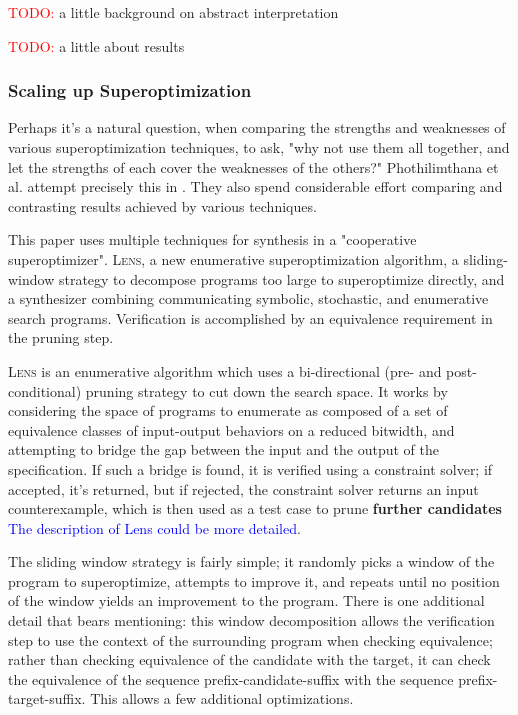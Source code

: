 \documentclass[12pt,twoside]{reedthesis}
\newcommand{\red}[1]{\textcolor{red}{#1}}
\newcommand{\comment}[2]{\textbf{#1} \textcolor{blue}{#2}}
\begin{document}
\red{TODO:} a little background on abstract interpretation
    
\red{TODO:} a little about results

\subsubsection{Scaling up Superoptimization}

Perhaps it's a natural question, when comparing the strengths and weaknesses of various superoptimization techniques, to ask, "why not use them all together, and let the strengths of each cover the weaknesses of the others?"
Phothilimthana et al. attempt precisely this in \cite{phothilimthana2016scaling}.
They also spend considerable effort comparing and contrasting results achieved by various techniques.
    
This paper uses multiple techniques for synthesis in a "cooperative superoptimizer".
\textsc{Lens}, a new enumerative superoptimization algorithm,
a sliding-window strategy to decompose programs too large to superoptimize directly,
and a synthesizer combining communicating symbolic, stochastic, and enumerative search programs.
Verification is accomplished by an equivalence requirement in the pruning step.
    
\textsc{Lens} is an enumerative algorithm which uses a bi-directional (pre- and post-conditional) pruning strategy to cut down the search space.
It works by considering the space of programs to enumerate as composed of a set of equivalence classes of input-output behaviors on a reduced bitwidth, and attempting to bridge the gap between the input and the output of the specification.
If such a bridge is found, it is verified using a constraint solver;
        if accepted, it's returned,
        but if rejected, the constraint solver returns an input counterexample,
    which is then used as a test case to prune
    \comment{further candidates}{The description of Lens could be more detailed}.

The sliding window strategy is fairly simple; it randomly picks a window of the program to superoptimize, attempts to improve it, and repeats until no position of the window yields an improvement to the program.
There is one additional detail that bears mentioning: 
    this window decomposition allows the verification step to use the context of the surrounding program when checking equivalence;
    rather than checking equivalence of the candidate with the target, it can check the equivalence of the sequence prefix-candidate-suffix with the sequence prefix-target-suffix.
This allows a few additional optimizations.
\end{document}
